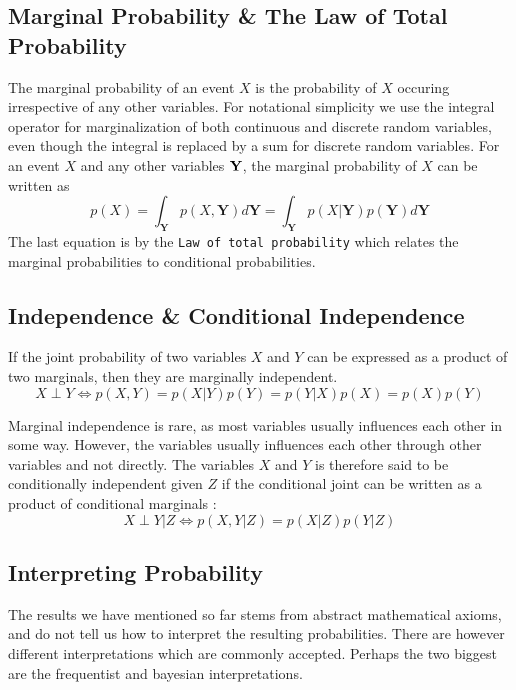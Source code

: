 \subsection{Marginal Probability \& The Law of Total Probability}
The marginal probability of an event $X$ is the probability of $X$ occuring irrespective of any other variables.
For notational simplicity we use the integral operator for marginalization of both continuous and discrete random variables, even though the integral is replaced by a sum for discrete random variables. For an event $X$ and any other variables $\bf Y$, the marginal probability of $X$ can be written as
\begin{equation}
    p(X) = \int_{\boldsymbol{Y}} p(X, \boldsymbol{Y}) d\boldsymbol{Y} = \int_{\boldsymbol{Y}} p(X | \boldsymbol{Y}) p(\boldsymbol{Y}) d\boldsymbol{Y}
\end{equation}
The last equation is by the \texttt{Law of total probability} which relates the marginal probabilities to conditional probabilities.

\subsection{Independence \& Conditional Independence}
If the joint probability of two variables $X$ and $Y$ can be expressed as a product of two marginals, then they are marginally independent.
\begin{equation}
    X \perp Y \iff p(X, Y) = p(X | Y)p(Y) = p(Y | X)p(X) = p(X)p(Y)
\end{equation}

Marginal independence is rare, as most variables usually influences each other in some way. However, the variables usually influences each other through other variables and not directly. The variables $X$ and $Y$ is therefore said to be conditionally independent given $Z$ if the conditional joint can be written as a product of conditional marginals \cite[p.~31]{murphy}:
\begin{equation}\label{eq:conditional_independence}
    X \perp Y | Z \iff p(X, Y | Z) = p(X | Z)p(Y | Z)
\end{equation}

\subsection{Interpreting Probability}
The results we have mentioned so far stems from abstract mathematical axioms, and do not tell us how to interpret the resulting probabilities. There are however different interpretations which are commonly accepted. Perhaps the two biggest are the frequentist and bayesian interpretations. 

